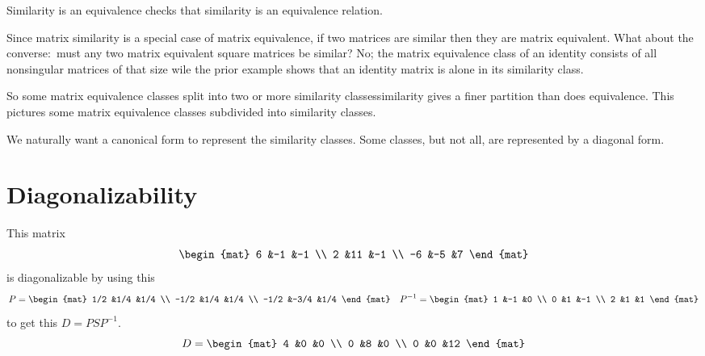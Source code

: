 \documentclass[10pt,t]{beamer}
\begin{document}
\begin{frame}{Similarity is an equivalence}
 checks that
similarity is an equivalence relation.

\pause
Since matrix similarity is a special case of matrix equivalence, 
if two matrices are similar then they are matrix equivalent.
What about the converse:~must any two matrix equivalent square matrices be 
similar?
No; the matrix equivalence class
of an identity consists of all nonsingular matrices of that size wile the 
prior example shows that an identity matrix is alone in its similarity
class. 

\pause
So some matrix equivalence classes
split into two or more similarity classes\Dash similarity gives a finer
partition than does equivalence.
This pictures some matrix equivalence classes subdivided into
similarity classes.

\pause
We naturally want a canonical form to represent the similarity classes.
Some classes, but not all,
are represented by a diagonal form.
\end{frame}




\section{Diagonalizability}
\begin{frame}
\df[df:Diagonalizable]

\ex
This matrix
\begin{equation*}
  \begin{mat}
    6 &-1  &-1 \\
    2 &11  &-1 \\
   -6 &-5  &7
  \end{mat}
\end{equation*}
is diagonalizable by using this
\begin{equation*}
  P=
  \begin{mat}
    1/2 &1/4  &1/4 \\
   -1/2 &1/4  &1/4 \\
   -1/2 &-3/4 &1/4
  \end{mat}
  \quad
  P^{-1}=
  \begin{mat}
    1 &-1 &0 \\
    0 &1 &-1 \\
    2 &1 &1
  \end{mat}
\end{equation*}
to get this $D=PSP^{-1}$.
\begin{equation*}
  D=
  \begin{mat}
    4 &0 &0 \\
    0 &8 &0 \\
    0 &0 &12
  \end{mat}
\end{equation*}
\end{frame}
\begin{frame}
\ex  
{}  
\end{frame}
\end{document}
